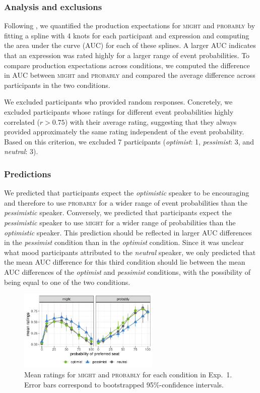 \documentclass[man,floatsintext]{apa6}
\begin{document}
\subsubsection{Analysis and exclusions}

Following , we quantified the production expectations for \textsc{might} and \textsc{probably} by fitting a spline with 4 knots for each participant and expression and computing the area under the curve (AUC) for each of these splines. A larger AUC indicates that an expression was rated highly for a larger range of event probabilities. To compare production expectations across conditions, we computed the difference in AUC between \textsc{might} and \textsc{probably} and compared the average difference across participants in the two conditions.

We excluded participants who provided random responses. Concretely, we excluded participants whose ratings for different event probabilities highly correlated ($r>0.75$) with their average rating, suggesting that they always provided approximately the same rating independent of the event probability. Based on this criterion, we excluded 7 participants (\textit{optimist}: 1, \textit{pessimist}: 3, and \textit{neutral}: 3).

\subsubsection{Predictions}

We predicted that participants expect the \textit{optimistic} speaker to be encouraging and therefore to use \textsc{probably} for a wider range of event probabilities than the \textit{pessimistic} speaker. Conversely, we predicted that participants expect the \textit{pessimistic} speaker to use \textsc{might} for a wider range of probabilities than the \textit{optimistic} speaker. This prediction should be reflected in larger AUC differences in the \textit{pessimist} condition than in the \textit{optimist} condition. Since it was unclear what mood participants attributed to the \textit{neutral} speaker, we only predicted that the mean AUC difference for this third condition should lie between the mean AUC differences of the \textit{optimist} and \textit{pessimist} conditions, with the possibility of being equal to one of the two conditions.

\begin{figure}[t]
    \centering
    \includegraphics[width=0.6\textwidth]{norming.pdf}
    \caption{Mean ratings for \textsc{might} and \textsc{probably} for each condition in Exp.~1. Error bars correspond to bootstrapped 95\%-confidence intervals.}
    \label{fig:results-exp1}
\end{figure}
\end{document}
